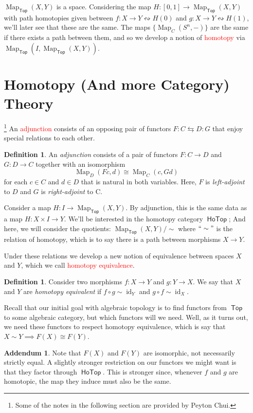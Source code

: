 \documentclass[leqno, openany]{memoir}
\theoremstyle{definition}
\newtheorem{defn}[thm]{Definition}
\theoremstyle{remark}
\theoremstyle{plain}
\theoremstyle{definition}
\newtheorem*{addm*}{Addendum}
\theoremstyle{remark}
\newcommand{\iso}{\cong}
\DeclareMathOperator{\Top}{\mathsf{Top}}
\DeclareMathOperator{\Hotop}{\mathsf{HoTop}}
\DeclareMathOperator{\id}{id}
\DeclareMathOperator{\Map}{Map}
\begin{document}
$\Map_{\Top}(X,Y)$ is a space. Considering the map $H: [0,1] \to \Map_{\Top}(X,Y)$ with path homotopies given between $f:X \to Y \leftrightsquigarrow H(0)$ and $g: X \to Y \leftrightsquigarrow H(1)$, we'll later see that these are the same.  The maps $\{\Map_C(S^n, -)\}$ are the same if there exists a path between them, and so we develop a notion of \textcolor{red}{homotopy} via $\Map_{\Top}(I, \Map_{\Top}(X,Y))$.

\newpage
\section{Homotopy (And more Category) Theory}\footnote{Some of the notes in the following section are provided by Peyton Chui.}
An \textcolor{red}{adjunction} consists of an opposing pair of functors $F: C \leftrightarrows D: G$ that enjoy special relations to each other.

\begin{defn}
    An \emph{adjunction} consists of a pair of functors $F: C \to D$ and $G: D \to C$ together with an isomorphism 
    \[\Map_D(Fc, d) \iso \Map_C(c, Gd)\]
    for each $c\in C$ and $d \in D$ that is natural in both variables. Here, $F$ is \emph{left-adjoint} to $D$ and $G$ is \emph{right-adjoint} to C.
\end{defn}

Consider a map $H: I \to \Map_{\Top}(X,Y)$. By adjunction, this is the same data as a map $H: X \times I \to Y$. We'll be interested in the homotopy category $\Hotop$; And here, we will consider the quotients:  $\Map_{\Top}(X,Y)/\sim$ where $``\sim "$ is the relation of homotopy, which is to say there is a path between morphisms $X \to Y$.

Under these relations we develop a new notion of equivalence between spaces $X$ and $Y$, which we call \textcolor{red}{homotopy equivalence}.


\begin{defn}
    Consider two morphisms $f: X \to Y$ and $g: Y \to X$. We say that $X$ and $Y$ are \emph{homotopy equivalent} if $f \circ g \sim \id_Y$ and $g \circ f \sim \id_X$.
\end{defn}

Recall that our initial goal with algebraic topology is to find functors from $\Top$ to some algebraic category, but which functors will we need. Well, as it turns out, we need these functors to respect homotopy equivalence, which is say that $X \sim Y \implies F(X) \iso F(Y)$. 

\begin{addm*}
    Note that $F(X)$ and $F(Y)$ are isomorphic, not necessarily strictly equal. A slightly stronger restriction on our functors we might want is that they factor through $\Hotop$. This is stronger since, whenever $f$ and $g$ are homotopic, the map they induce must also be the same.
\end{addm*}
\end{document}
